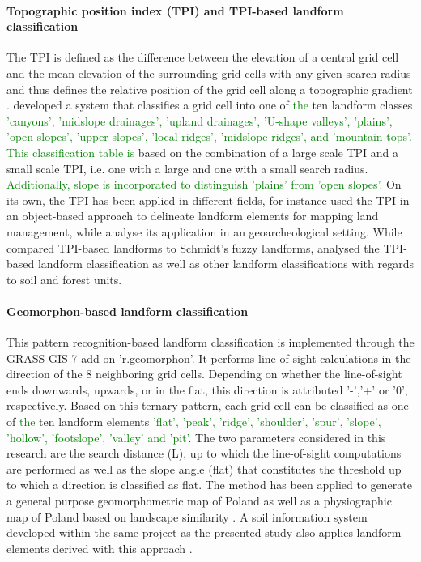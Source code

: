 \documentclass[preprint,12pt,authoryear]{elsarticle}
\begin{document}
\paragraph{Topographic position index (TPI) and TPI-based landform classification \citep{Weiss2000}}
The TPI is defined as the difference between the elevation of a central grid cell and the mean elevation of the surrounding grid cells with any given search radius and thus defines the relative position of the grid cell along a topographic gradient \citep{Guisan1999}. \cite{Weiss2000} developed a system that classifies a grid cell into one of \textcolor{green} {the} ten landform classes \textcolor{green}{'canyons', 'midslope drainages', 'upland drainages', 'U-shape valleys', 'plains', 'open slopes', 'upper slopes', 'local ridges', 'midslope ridges', and 'mountain tops'. This classification table is} based on the combination of a large scale TPI and a small scale TPI, i.e. one with a large and one with a small search radius. \textcolor{green} {Additionally, slope is incorporated to distinguish 'plains' from 'open slopes'.}
 On its own, the TPI has been applied in different fields, for instance \cite{Gercek2010} used the TPI in an object-based approach to delineate landform elements for mapping land management, while \cite{Reu2013} analyse its application in an geoarcheological setting. While \cite{Mokarram2015} compared TPI-based landforms to Schmidt's fuzzy landforms, \cite{Barka2011} analysed the TPI-based landform classification as well as other landform classifications with regards to  soil and forest units.
\paragraph{Geomorphon-based landform classification \citep{Jasiewicz2013}}
This pattern recognition-based landform classification is implemented through the GRASS GIS 7 add-on 'r.geomorphon'. It performs line-of-sight calculations in the direction of the 8 neighboring grid cells.  Depending on whether the line-of-sight ends downwards,  upwards, or in the flat, this direction is attributed '-','+' or '0', respectively.  Based on this ternary pattern, each grid cell can be classified as one of \textcolor{green} {the} ten landform elements \textcolor{green}{'flat', 'peak', 'ridge', 'shoulder', 'spur', 'slope', 'hollow', 'footslope', 'valley' and 'pit'}. The two parameters considered in this research are the search distance (L), up to which the line-of-sight computations are performed as well as the slope angle (flat) that constitutes the threshold up to which a direction is classified as flat. The method has been applied to generate a general purpose geomorphometric map of Poland \citep{Jasiewicz2013} as well as a physiographic map of Poland based on landscape similarity \citep{Jasiewicz2014}. A soil information system developed within the same project as the presented study also applies landform elements derived with this approach \citep{Geitner2017}.
\end{document}
